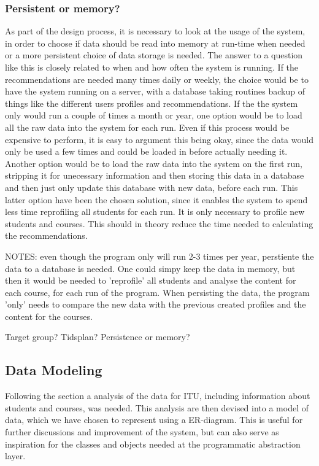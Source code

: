 \subsubsection{Persistent or memory?}
As part of the design process, it is necessary to look at the usage of the system, in order to choose if data should be read into memory at run-time when needed or a more persistent choice of data storage is needed. The answer to a question like this is closely related to when and how often the system is running. If the recommendations are needed many times daily or weekly, the choice would be to have the system running on a server, with a database taking routines backup of things like the different users profiles and recommendations. If the the system only would run a couple of times a month or year, one option would be to load all the raw data into the system for each run. Even if this process would be expensive to perform, it is easy to argument this being okay, since the data would only be used a few times and could be loaded in before actually needing it. Another option would be to load the raw data into the system on the first run, stripping it for unecessary information and then storing this data in a database and then just only update this database with new data, before each run. This latter option have been the chosen solution, since it enables the system to spend less time reprofiling all students for each run. It is only necessary to profile new students and courses. This should in theory reduce the time needed to calculating the recommendations.

NOTES:
even though the program only will run 2-3 times per year, perstiente the data to a database is needed. One could simpy keep the data in memory, but then it would be needed to 'reprofile' all students and analyse the content for each course, for each run of the program. When persisting the data, the program 'only' needs to compare the new data with the previous created profiles and the content for the courses.


Target group?
Tidsplan?
Persistence or memory?
\subsection{Data Modeling}
Following the section  a analysis of the data for ITU, including information about students and courses, was needed. This analysis are then devised into a model of data, which we have chosen to represent using a ER-diagram. This is useful for further discussions and improvement of the system, but can also serve as inspiration for the classes and objects needed at the programmatic abstraction layer. 

